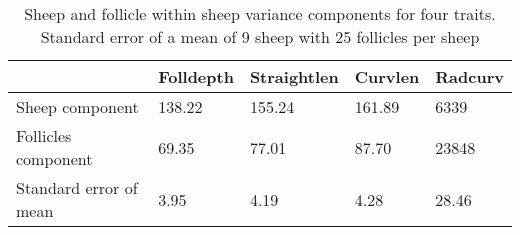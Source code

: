 %

\begin{table}[ht]
\centering
\caption{Sheep and follicle within sheep variance components for four traits. Standard error of a mean of 9 sheep with 25 follicles per sheep}
\label{tab:se}
\vspace{0.1in}
\begin{tabular}{|p{1.6in}|p{0.6in}|p{0.6in}|p{0.6in}|p{0.6in}|} \hline
   & Folldepth & Straightlen & Curvlen  & Radcurv\\   
    \hline
 Sheep component & 138.22 & 155.24 & 161.89 & 6339 \\
 Follicles component & 69.35 & 77.01 & 87.70 & 23848\\
 Standard error of mean & 3.95 & 4.19 & 4.28 & 28.46\\
   \hline
\end{tabular}
\end{table}

%


